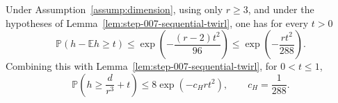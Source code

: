 \begin{proposition}
\label{prop:step-007-product-tail}
Under Assumption~\ref{assump:dimension}, using only \(r\ge3\), and under the
hypotheses of Lemma~\ref{lem:step-007-sequential-twirl}, one has for every
\(t>0\)
\begin{equation}
  \mathbb P(h-\mathbb Eh\ge t)
  \le \exp\!\left(-\frac{(r-2)t^2}{96}\right)
  \le \exp\!\left(-\frac{rt^2}{288}\right).                \label{eq:step-007-17}
\end{equation}
Combining this with Lemma~\ref{lem:step-007-sequential-twirl}, for
\(0<t\le1\),
\begin{equation}
  \mathbb P\!\left(h\ge\frac d{r^3}+t\right)
  \le 8\exp(-c_Hrt^2),
  \qquad \boxed{c_H=\frac1{288}}.                          \label{eq:step-007-18}
\end{equation}

\end{proposition}

